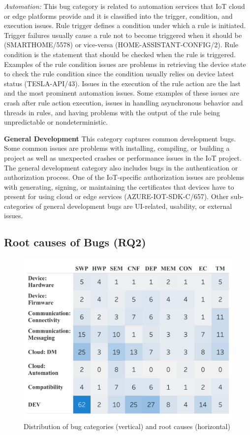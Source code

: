 \textit{Automation:}
This bug category is related to automation services that IoT cloud or edge platforms provide and it is classified into the trigger, condition, and execution issues. Rule trigger defines a condition under which a rule is initiated. Trigger failures usually cause a rule not to become triggered when it should be (SMARTHOME/5578) or vice-versa (HOME-ASSISTANT-CONFIG/2). Rule condition is the statement that should be checked when the rule is triggered. Examples of the rule condition issues are problems in retrieving the device state to check the rule condition since the condition usually relies on device latest status (TESLA-API/43). Issues in the execution of the rule action are the last and the most prominent automation issues. Some examples of these issues are crash after rule action execution, issues in handling asynchronous behavior and threads in rules, and having problems with the output of the rule being unpredictable or nondeterministic.

\textbf{General Development}
This category captures common development bugs. Some common issues are problems with installing, compiling, or building a project as well as unexpected crashes or performance issues in the IoT project. The general development category also includes bugs in the authentication or authorization process. One of the IoT-specific authorization issues are problems with generating, signing, or maintaining the certificates that devices have to present for using cloud or edge services (AZURE-IOT-SDK-C/657). Other sub-categories of general development bugs are UI-related, usability, or external issues.

\subsection{Root causes of Bugs (RQ2)}

 \begin{figure}
  \centering
   \includegraphics[width=\linewidth]{imgs/rcvis.pdf}
  \caption{Distribution of bug categories (vertical) and root causes (horizontal)}
  \label{fig:bugRC2d}
\end{figure}

